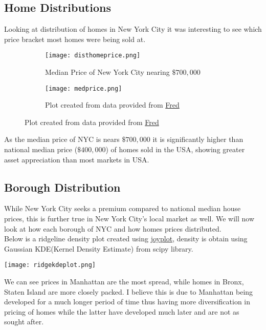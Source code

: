 \documentclass{article}
\begin{document}
\begin{titlepage}
\subsection{Home Distributions}
Looking at distribution of homes in New York City it was interesting to see which price bracket most homes were being sold at.

\begin{figure}[ht]

\begin{subfigure}{.5\textwidth}
\texttt{[image: disthomeprice.png]}
\caption{Median Price of New York City nearing $\$700,000$ }
\label{fig:subim1}
\end{subfigure}
\begin{subfigure}{.5\textwidth}
\texttt{[image: medprice.png]}
\caption{Plot created from data provided from \href{https://fred.stlouisfed.org/series/MSPUS}{Fred}}
\label{fig:subim2}
\end{subfigure}
\newline
\label{fig:image2}
\end{figure}
As the median price of NYC is nears $\$700,000$ it is significantly higher than national median price ($\$400,000$) of homes sold in the USA, showing greater asset appreciation than most markets in USA.
\clearpage





\subsection{Borough Distribution}
While New York City seeks a premium compared to national median house prices, this is further true in New York City's local market as well. We will now look at how each borough of NYC and how homes prices distributed.
\newline
\\

Below is a ridgeline density plot created using \href{https://github.com/leotac/joypy}{joyplot}, density is obtain using Gaussian KDE(Kernel Density Estimate) from scipy library.

\begin{center}
        \texttt{[image: ridgekdeplot.png]}
\end{center}

We can see prices in Manhattan are the most spread, while homes in Bronx, Staten Island are more closely packed. I believe this is due to Manhattan being developed for a much longer period of time thus having more diversification in pricing of homes while the latter have developed much later and are not as sought after. \\
\clearpage


\end{titlepage}
\end{document}
